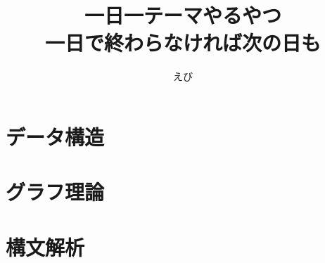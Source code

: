 \documentclass[a4paper]{jsarticle}
\title{
  {\Huge 一日一テーマやるやつ}\\
  {\Large 一日で終わらなければ次の日も}
}
\author{
  えび
}
\begin{document}
\maketitle

\newpage
\tableofcontents

\newpage
{}
\setcounter{section}{0}
\renewcommand{\thesection}{\arabic{section}}

\section{データ構造}




\newpage
\section{グラフ理論}


\newpage
\section{構文解析}



\end{document}
